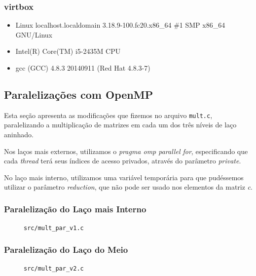 \documentclass[a4paper, 12pt]{article}
\begin{document}
\subsubsection{virtbox}

\begin{itemize}
    \item Linux localhost.localdomain 3.18.9-100.fc20.x86\_64 \#1 SMP x86\_64
        GNU/Linux
    \item Intel(R) Core(TM) i5-2435M CPU
    \item gcc (GCC) 4.8.3 20140911 (Red Hat 4.8.3-7)
\end{itemize}

\subsection{Paralelizações com OpenMP} \label{sec:code}

Esta seção apresenta as modificações que fizemos no arquivo
\texttt{mult.c}, paralelizando a multiplicação de matrizes
em cada um dos três níveis de laço aninhado.

Nos laços mais externos, utilizamos o \textit{pragma omp parallel for},
especificando que cada \textit{thread} terá seus índices de
acesso privados, através do parâmetro \textit{private}.

No laço mais interno, utilizamos uma variável temporária para que pudéssemos
utilizar o parâmetro \textit{reduction}, que não pode ser usado nos elementos
da matriz \textit{c}.

\subsubsection{Paralelização do Laço mais Interno}

\begin{figure}[H]
    \centering
    
    \caption{\texttt{src/mult\_par\_v1.c}}
    \label{fig:par_v1}
\end{figure}

\subsubsection{Paralelização do Laço do Meio}

\begin{figure}[H]
    \centering
    
    \caption{\texttt{src/mult\_par\_v2.c}}
    \label{fig:par_v2}
\end{figure}
\end{document}

